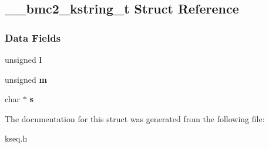 \hypertarget{struct____bmc2__kstring__t}{}\subsection{\+\_\+\+\_\+bmc2\+\_\+kstring\+\_\+t Struct Reference}
\label{struct____bmc2__kstring__t}
\subsubsection*{Data Fields}
\begin{DoxyCompactItemize}
\item 
\mbox{\label{struct____bmc2__kstring__t_a0cc4a6e0f77f6bd124651008e33d91d6}} 
unsigned {\bfseries l}
\item 
\mbox{\label{struct____bmc2__kstring__t_a3db2d68492a82fd3dd63786e04ea8d1b}} 
unsigned {\bfseries m}
\item 
\mbox{\label{struct____bmc2__kstring__t_ad8edcbba5c56c6f256911623e7893464}} 
char $\ast$ {\bfseries s}
\end{DoxyCompactItemize}


The documentation for this struct was generated from the following file\+:\begin{DoxyCompactItemize}
\item 
kseq.\+h\end{DoxyCompactItemize}
